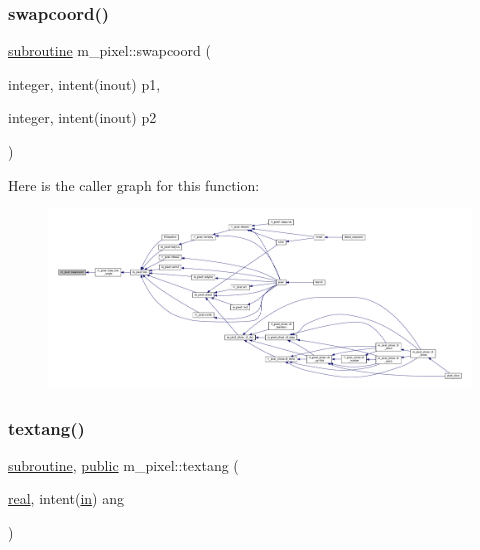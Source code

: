 \subsubsection{\texorpdfstring{swapcoord()}{swapcoord()}}
{\footnotesize\ttfamily \hyperlink{M__stopwatch_83_8txt_acfbcff50169d691ff02d4a123ed70482}{subroutine} m\+\_\+pixel\+::swapcoord (\begin{DoxyParamCaption}\item[{integer, intent(inout)}]{p1,  }\item[{integer, intent(inout)}]{p2 }\end{DoxyParamCaption})\hspace{0.3cm}{\ttfamily [private]}}

Here is the caller graph for this function\+:
\nopagebreak
\begin{figure}[H]
\begin{center}
\leavevmode
\includegraphics[width=350pt]{namespacem__pixel_a063f74c3dd2f7f086dc47ec68abc22c9_icgraph}
\end{center}
\end{figure}
\mbox{\label{namespacem__pixel_a5e213461e9894b99c9e8f278d5c4a858}} 
\subsubsection{\texorpdfstring{textang()}{textang()}}
{\footnotesize\ttfamily \hyperlink{M__stopwatch_83_8txt_acfbcff50169d691ff02d4a123ed70482}{subroutine}, \hyperlink{M__stopwatch_83_8txt_a2f74811300c361e53b430611a7d1769f}{public} m\+\_\+pixel\+::textang (\begin{DoxyParamCaption}\item[{\hyperlink{read__watch_83_8txt_abdb62bde002f38ef75f810d3a905a823}{real}, intent(\hyperlink{M__journal_83_8txt_afce72651d1eed785a2132bee863b2f38}{in})}]{ang }\end{DoxyParamCaption})}



